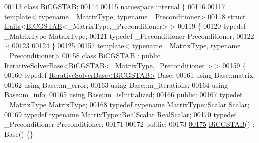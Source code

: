\begin{DoxyCode}
\hyperlink{group___iterative_linear_solvers___module}{00113} \textcolor{keyword}{class }\hyperlink{group___iterative_linear_solvers___module_class_eigen_1_1_bi_c_g_s_t_a_b}{BiCGSTAB};
00114 
00115 \textcolor{keyword}{namespace }\hyperlink{namespaceinternal}{internal} \{
00116 
00117 \textcolor{keyword}{template}< \textcolor{keyword}{typename} \_MatrixType, \textcolor{keyword}{typename} \_Preconditioner>
\hyperlink{struct_eigen_1_1internal_1_1traits_3_01_bi_c_g_s_t_a_b_3_01___matrix_type_00_01___preconditioner_01_4_01_4}{00118} \textcolor{keyword}{struct }\hyperlink{struct_eigen_1_1internal_1_1traits}{traits}<\hyperlink{group___iterative_linear_solvers___module_class_eigen_1_1_bi_c_g_s_t_a_b}{BiCGSTAB}<\_MatrixType,\_Preconditioner> >
00119 \{
00120   \textcolor{keyword}{typedef} \_MatrixType MatrixType;
00121   \textcolor{keyword}{typedef} \_Preconditioner Preconditioner;
00122 \};
00123 
00124 \}
00125 
00157 \textcolor{keyword}{template}< \textcolor{keyword}{typename} \_MatrixType, \textcolor{keyword}{typename} \_Preconditioner>
00158 \textcolor{keyword}{class }\hyperlink{group___iterative_linear_solvers___module_class_eigen_1_1_bi_c_g_s_t_a_b}{BiCGSTAB} : \textcolor{keyword}{public} \hyperlink{group___iterative_linear_solvers___module_class_eigen_1_1_iterative_solver_base}{IterativeSolverBase}<BiCGSTAB<\_MatrixType,\_Preconditioner
      > >
00159 \{
00160   \textcolor{keyword}{typedef} \hyperlink{group___iterative_linear_solvers___module_class_eigen_1_1_iterative_solver_base}{IterativeSolverBase<BiCGSTAB>} Base;
00161   \textcolor{keyword}{using} Base::matrix;
00162   \textcolor{keyword}{using} Base::m\_error;
00163   \textcolor{keyword}{using} Base::m\_iterations;
00164   \textcolor{keyword}{using} Base::m\_info;
00165   \textcolor{keyword}{using} Base::m\_isInitialized;
00166 \textcolor{keyword}{public}:
00167   \textcolor{keyword}{typedef} \_MatrixType MatrixType;
00168   \textcolor{keyword}{typedef} \textcolor{keyword}{typename} MatrixType::Scalar Scalar;
00169   \textcolor{keyword}{typedef} \textcolor{keyword}{typename} MatrixType::RealScalar RealScalar;
00170   \textcolor{keyword}{typedef} \_Preconditioner Preconditioner;
00171 
00172 \textcolor{keyword}{public}:
00173 
\hyperlink{group___iterative_linear_solvers___module_ae1a0df6ef6e947256c3cb83ce7df7eda}{00175}   \hyperlink{group___iterative_linear_solvers___module_ae1a0df6ef6e947256c3cb83ce7df7eda}{BiCGSTAB}() : Base() \{\}

\end{DoxyCode}
